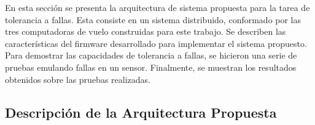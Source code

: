 
En esta sección se presenta la arquitectura de sistema propuesta para la tarea de tolerancia a fallas. Esta consiste en un sistema distribuido, conformado por las tres computadoras de vuelo construidas para este trabajo. Se describen las características del firmware desarrollado para implementar el sistema propuesto. Para demostrar las capacidades de tolerancia a fallas, se hicieron una serie de pruebas emulando fallas en un sensor. Finalmente, se muestran los resultados obtenidos sobre las pruebas realizadas.












\subsection{Descripción de la Arquitectura Propuesta}

